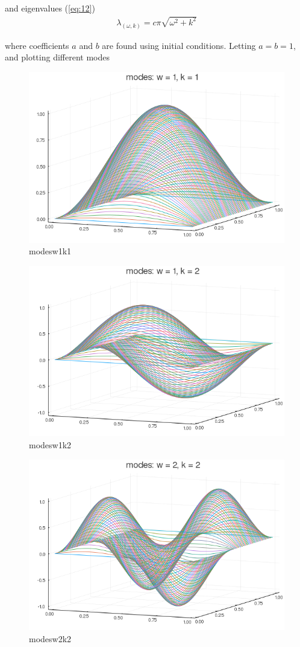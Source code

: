 and eigenvalues (\ref{eq:12})
\begin{gather}
  \boxed{\lambda _{ (\omega ,k)} = c \pi \sqrt{ \omega ^2 + k^2}} \label{eq:12}
\end{gather}

where coefficients $a$ and $b$ are found using initial conditions. Letting $a
= b = 1$, and plotting different modes

\begin{figure}[H]
  \centering
  \includegraphics[width=0.8\linewidth]{./assignment_02/figures/modes_w1_k1.png}
  \caption{modesw1k1}%
  \label{fig:modesw1k1}
\end{figure}
\begin{figure}[H]
  \centering
  \includegraphics[width=0.8\linewidth]{./assignment_02/figures/modes_w1_k2.png}
  \caption{modesw1k2}%
  \label{fig:modesw1k2}
\end{figure}
\begin{figure}[H]
  \centering
  \includegraphics[width=0.8\linewidth]{./assignment_02/figures/modes_w2_k2.png}
  \caption{modesw2k2}%
  \label{fig:modesw2k2}
\end{figure}


